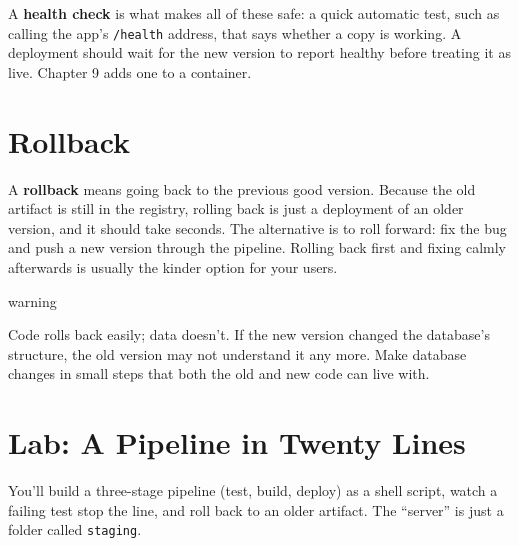 A \textbf{health check} is what makes all of these safe: a quick automatic test, such as calling the app's \texttt{/health} address, that says whether a copy is working. A deployment should wait for the new version to report healthy before treating it as live. Chapter 9 adds one to a container.

\section{Rollback}\label{04-pipelines-from-a-commit-to-production:rollback}

A \textbf{rollback} means going back to the previous good version. Because the old artifact is still in the registry, rolling back is just a deployment of an older version, and it should take seconds. The alternative is to roll forward: fix the bug and push a new version through the pipeline. Rolling back first and fixing calmly afterwards is usually the kinder option for your users.

\begin{callout}{warning}

Code rolls back easily; data doesn't. If the new version changed the database's structure, the old version may not understand it any more. Make database changes in small steps that both the old and new code can live with.

\end{callout}

\section{Lab: A Pipeline in Twenty Lines}\label{04-pipelines-from-a-commit-to-production:lab-a-pipeline-in-twenty-lines}

You'll build a three-stage pipeline (test, build, deploy) as a shell script, watch a failing test stop the line, and roll back to an older artifact. The ``server'' is just a folder called \texttt{staging}.

